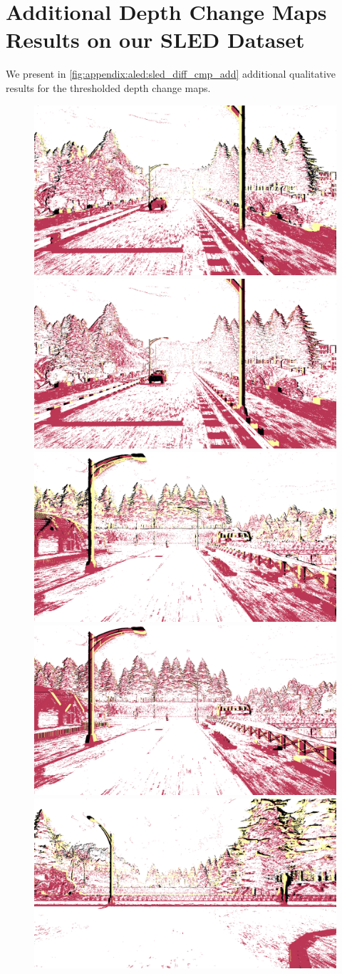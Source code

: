 \section{Additional Depth Change Maps Results on our SLED Dataset}\label{sec:appendix:aled:sled_diff_cmp_add}
We present in \cref{fig:appendix:aled:sled_diff_cmp_add} additional qualitative results for the thresholded depth change maps.

\begin{figure}
  \centering
  \includegraphics[width=0.475\linewidth]{mainmatter/figures/b_depth_conv/sled_diff_cmp_additional/pdiff000750.png}
  \includegraphics[width=0.475\linewidth]{mainmatter/figures/b_depth_conv/sled_diff_cmp_additional/gtdiff000750.png}
  \includegraphics[width=0.475\linewidth]{mainmatter/figures/b_depth_conv/sled_diff_cmp_additional/pdiff000994.png}
  \includegraphics[width=0.475\linewidth]{mainmatter/figures/b_depth_conv/sled_diff_cmp_additional/gtdiff000994.png}
  \includegraphics[width=0.475\linewidth]{mainmatter/figures/b_depth_conv/sled_diff_cmp_additional/pdiff003720.png}

\end{figure}
